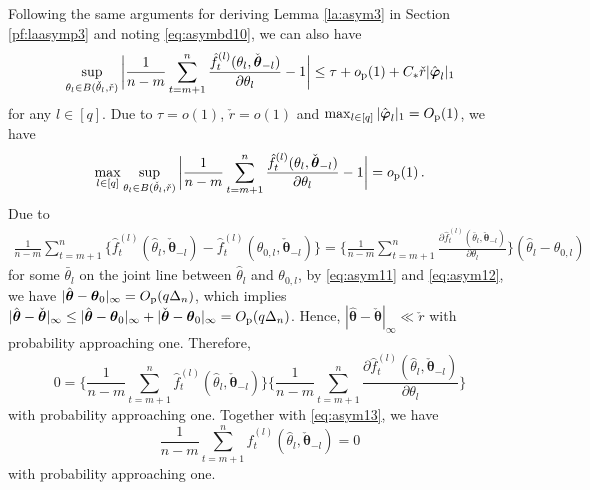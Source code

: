 \documentclass[12pt]{article}
\newcommand{\btheta}{\boldsymbol \theta}
\newcommand{\bvarphi}{\boldsymbol \varphi}
\newcommand{\0}{{\bf 0}}
\begin{document}
Following the same arguments for deriving Lemma \ref{la:asym3} in Section \ref{pf:laasymp3} and noting \eqref{eq:asymbd10}, we can also have
\begin{align}\label{eq:asym12}
\sup_{\theta_l\in B(\check{\theta}_l,\check{r})}\bigg|\frac{1}{n-m}\sum_{t=m+1}^n\frac{\hat{f}_t^{(l)}(\theta_l,\check{\btheta}_{-l})}{\partial\theta_l}-1\bigg|\leq \tau+o_{\rm p}(1)+C_*\check{r}|\hat{\bvarphi}_l|_1
\end{align}
for any $l\in[q]$. Due to $\tau=o(1)$, $\check{r}=o(1)$ and $\max_{l\in[q]}|\hat{\bvarphi}_l|_1=O_{\rm p}(1)$, we have
\begin{align}\label{eq:asym13}
\max_{l\in[q]}\sup_{\theta_l\in B(\check{\theta}_l,\check{r})}\bigg|\frac{1}{n-m}\sum_{t=m+1}^n\frac{\hat{f}_t^{(l)}(\theta_l,\check{\btheta}_{-l})}{\partial\theta_l}-1\bigg|=o_{\rm p}(1)\,.
\end{align}
Due to
\begin{align}\label{eq:asymbd14}
\frac{1}{n-m}\sum_{t=m+1}^n\big\{\hat{f}_t^{(l)}(\hat{\theta}_{l},\check{\btheta}_{-l})-\hat{f}_t^{(l)}(\theta_{0,l},\check{\btheta}_{-l})\big\}=\bigg\{\frac{1}{n-m}\sum_{t=m+1}^n\frac{\partial\hat{f}_t^{(l)}(\bar{\theta}_l,\check{\btheta}_{-l})}{\partial\theta_l}\bigg\}(\hat{\theta}_l-\theta_{0,l})
\end{align}
for some $\bar{\theta}_l$ on the joint line between $\hat{\theta}_l$ and $\theta_{0,l}$, by \eqref{eq:asym11} and \eqref{eq:asym12}, we have $|\hat{\btheta}-\btheta_0|_\infty=O_{\rm p}(q\Delta_n)$, which implies $|\hat{\btheta}-\check{\btheta}|_\infty\leq |\hat{\btheta}-\btheta_0|_\infty+|\check{\btheta}-\btheta_0|_\infty=O_{\rm p}(q\Delta_n)$. Hence, $|\hat{\btheta}-\check{\btheta}|_\infty\ll\check{r}$ with probability approaching one. Therefore, 
\[
0=\bigg\{\frac{1}{n-m}\sum_{t=m+1}^n\hat{f}_t^{(l)}(\hat{\theta}_l,\check{\btheta}_{-l})\bigg\}\bigg\{\frac{1}{n-m}\sum_{t=m+1}^n\frac{\partial\hat{f}_t^{(l)}(\hat{\theta}_l,\check{\btheta}_{-l})}{\partial\theta_l}\bigg\}
\]
with probability approaching one. Together with \eqref{eq:asym13}, we have
\[
\frac{1}{n-m}\sum_{t=m+1}^n\hat{f}_t^{(l)}(\hat{\theta}_l,\check{\btheta}_{-l})=0
\]
with probability approaching one.
\end{document}
